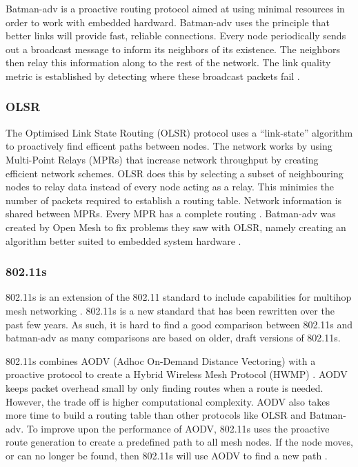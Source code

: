 Batman-adv is a proactive routing protocol aimed at using minimal resources in order to work with embedded hardward. 
Batman-adv uses the principle that better links will provide fast, reliable connections. Every node periodically sends out a broadcast message to inform its neighbors of its existence. The neighbors then relay this information along to the rest of the network. The link quality metric is established by detecting where these broadcast packets fail \cite{5375690}. 


\subsubsection{OLSR}

The Optimised Link State Routing (OLSR) protocol uses a ``link-state'' algorithm to proactively find efficent paths between nodes. The network works by using Multi-Point Relays (MPRs) that increase network throughput by creating efficient network schemes. OLSR does this by selecting a subset of neighbouring nodes to relay data instead of every node acting as a relay. This minimies the number of packets required to establish a routing table. Network information is shared between MPRs. Every MPR has a complete routing \cite{5375690}. Batman-adv was created by Open Mesh to fix problems they saw with OLSR, namely creating an algorithm better suited to embedded system hardware \cite{0032}. 

\subsubsection{802.11s}

802.11s is an extension of the 802.11 standard to include capabilities for multihop mesh networking \cite{5483777}. 802.11s is a new standard that has been rewritten over the past few years. As such, it is hard to find a good comparison between 802.11s and batman-adv as many comparisons are based on older, draft versions of 802.11s. 

802.11s combines AODV (Adhoc On-Demand Distance Vectoring) with a proactive protocol to create a Hybrid Wireless Mesh Protocol (HWMP) \cite{6379142}. AODV keeps packet overhead small by only finding routes when a route is needed. However, the trade off is higher computational complexity. AODV also takes more time to build a routing table than other protocols like OLSR and Batman-adv. To improve upon the performance of AODV, 802.11s uses the proactive route generation to create a predefined path to all mesh nodes. If the node moves, or can no longer be found, then 802.11s will use AODV to find a new path \cite{5483777}. 


